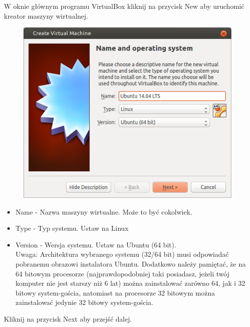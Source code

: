 W oknie głównym programu VirtualBox kliknij na przycisk \textcolor{ubuntu_orange}{New} aby uruchomić kreator maszyny wirtualnej.
\clearpage
\begin{figure}
                \includegraphics[width=\linewidth]{images/virtualbox_wizard1.png}
\end{figure}

\begin{itemize}
\item \textcolor{ubuntu_orange}{Name} - Nazwa maszyny wirtualne. Może to być cokolwiek.
\item \textcolor{ubuntu_orange}{Type} - Typ systemu. Ustaw na \textcolor{ubuntu_orange}{Linux}
\item \textcolor{ubuntu_orange}{Version} - Wersja systemu. Ustaw na \textcolor{ubuntu_orange}{Ubuntu (64 bit)}.\\
Uwaga: Architektura wybranego systemu (32/64 bit) musi odpowiadać pobranemu obrazowi instalatora Ubuntu. Dodatkowo należy pamiętać, że na 64 bitowym procesorze (najprawdopodobniej taki posiadasz, jeżeli twój komputer nie jest starszy niż 6 lat) można zainstalować zarówno 64, jak i 32 bitowy system-gościa, natomiast na procesorze 32 bitowym można zainstalować jedynie 32 bitowy system-gościa.
\end{itemize}
\begin{flushright}
Kliknij na przycisk \textcolor{ubuntu_orange}{Next} aby przejść dalej.
\end{flushright}

